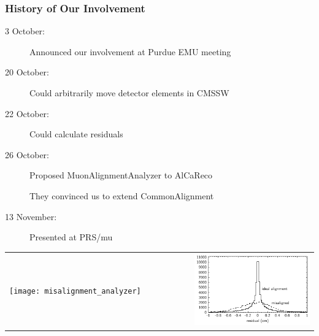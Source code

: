 \documentclass[compress]{beamer}
\begin{document}
\begin{frame}
\frametitle{History of Our Involvement}

\begin{description}
\item[3 October:] Announced our involvement at Purdue EMU meeting
\item[20 October:] Could arbitrarily move detector elements in CMSSW
\item[22 October:] Could calculate residuals
\item[26 October:] Proposed MuonAlignmentAnalyzer to AlCaReco
\item[] They convinced us to extend CommonAlignment
\item[13 November:] Presented at PRS/mu
\end{description}

\hspace{-0.8 cm}
\begin{minipage}{\linewidth}
\begin{tabular}{p{0.6\linewidth} p{0.5\linewidth}}
\begin{minipage}{\linewidth}
  \texttt{[image: misalignment\_analyzer]}
\end{minipage} &
\begin{minipage}{\linewidth}
  \hspace{-0.5 cm}
  \includegraphics[width=\linewidth]{all_residuals}
\end{minipage}
\end{tabular}
\end{minipage}

\end{frame}
\end{document}
